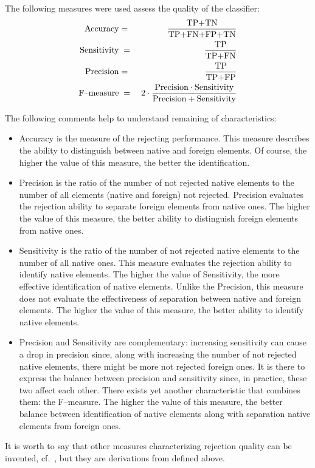 \documentclass{mini}
\begin{document}
The following measures were used assess the quality of the classifier:
\begin{eqnarray}
  \textnormal{Accuracy}    & = &   \displaystyle\frac{\textnormal{TP+TN}}{\textnormal{TP+FN+FP+TN}}\nonumber\\
  \textnormal{Sensitivity} &\;=\;& \displaystyle\frac{\textnormal{TP}}{\textnormal{TP+FN}}\nonumber\\
  \textnormal{Precision}   & = &   \displaystyle\frac{\textnormal{TP}}{\textnormal{TP+FP}}\nonumber\\
  \textnormal{F--measure}  &\;=\;& 2\cdot\frac{\mbox{Precision}\cdot\mbox{Sensitivity}}{\mbox{Precision}+\mbox{Sensitivity}}
\end{eqnarray}

The following comments help to understand remaining of characteristics:

\begin{itemize}
  \item Accuracy is the measure of the rejecting performance. This measure describes the ability to distinguish between native and foreign elements. Of course, the higher the value of this measure, the better the identification.
  \item Precision is the ratio of the number of not rejected native elements to the number of all elements (native and foreign) not rejected. Precision evaluates the rejection ability to separate foreign elements from native ones. The higher the value of this measure, the better ability to distinguish foreign elements from native ones.
  \item Sensitivity is the ratio of the number of not rejected native elements to the number of all native ones. This measure evaluates the rejection ability to identify native elements. The higher the value of Sensitivity, the more effective identification of native elements. Unlike the Precision, this measure does not evaluate the effectiveness of separation between native and foreign elements. The higher the value of this measure, the better ability to identify native elements.
  \item Precision and Sensitivity are complementary: increasing sensitivity can cause a drop in precision since, along with increasing the number of not rejected native elements, there might be more not rejected foreign ones. It is there to express the balance between precision and sensitivity since, in practice, these two affect each other. There exists yet another characteristic that combines them: the \mbox{F--measure}. The higher the value of this measure, the better balance between identification of native elements along with separation native elements from foreign ones.
\end{itemize}
It is worth to say that other measures characterizing rejection quality can be invented, cf.~\cite{Homenda_2014}, but they are derivations from defined above.  
\end{document}
